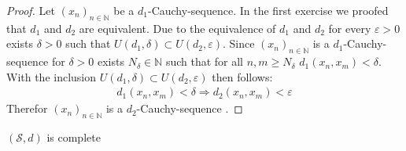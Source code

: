 \documentclass[a4paper]{article}
\newcommand{\N}{\mathbb{N}} %
\begin{document}
\begin{proof}
Let $(x_n)_{n \in \N}$ be a $d_1$-Cauchy-sequence.
In the first exercise we proofed that $d_1$ and $d_2$ are equivalent.
Due to the equivalence of $d_1$ and $d_2$ for  every $\varepsilon > 0$ exists $\delta > 0$ such that $U(d_1, \delta) \subset U(d_2, \varepsilon)$.
Since $(x_n)_{n \in \N}$ is a $d_1$-Cauchy-sequence for $\delta > 0$ exists  $N_{\delta} \in \N$ such that for all $n,m \geq N_{\delta}$ $d_1(x_n,x_m) < \delta$. With the inclusion $U(d_1, \delta) \subset U(d_2, \varepsilon)$ then follows:
\begin{align*}
    d_1(x_n,x_m) < \delta \Rightarrow d_2(x_n, x_m) < \varepsilon 
\end{align*}
Therefor $(x_n)_{n \in \N}$ is a $d_2$-Cauchy-sequence .
\end{proof}
\begin{issue}{}{}
    $(\mathcal{S}, d )$ is complete
\end{issue}
\end{document}
